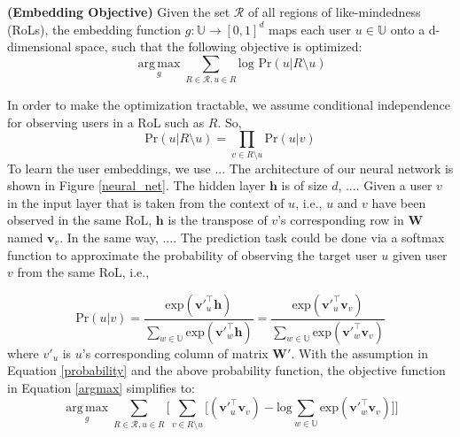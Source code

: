 \documentclass[sigconf]{acmart}
\begin{document}
\begin{definition}
\textbf{(Embedding Objective)} Given the set $\mathcal{R}$ of all regions of like-mindedness (RoLs), the embedding function $g:\mathbb{U}\rightarrow{[0,1]^d}$ maps each user $u\in\mathbb{U}$ onto a d-dimensional space, such that the following objective is optimized:
\begin{equation}\label{argmax}
    {\operatorname*{arg\,max}_g\sum_{R\in\mathcal{R},u\in{R}}{\text{log Pr}(u|R\setminus{u})}}
\end{equation}
\end{definition}

In order to make the optimization tractable, we assume conditional independence for observing users in a RoL such as $R$. So,
\begin{equation}\label{probability}
    \text{Pr}(u|R\setminus{u})=\prod_{v\in{R\setminus{u}}}{\text{Pr}(u|v)}
\end{equation}
To learn the user embeddings, we use ... The architecture of our neural network is shown in Figure \ref{neural_net}. The hidden layer $\textbf{h}$ is of size $d$, .... Given a user $v$ in the input layer that is taken from the context of $u$, i.e., $u$ and $v$ have been observed in the same RoL, $\textbf{h}$ is the transpose of $v$'s corresponding row in $\textbf{W}$ named $\textbf{v}_v$. In the same way, .... The prediction task could be done via a softmax function to approximate the probability of observing the target user $u$ given user $v$ from the same RoL, i.e.,


\begin{equation}\label{softmax}
\text{Pr}(u|v) = \frac{\text{exp}({\textbf{v}'^{\top}_u\textbf{h}})}{\sum\limits_{w\in\mathbb{U}}{\text{exp}({\textbf{v}'^{\top}_w\textbf{h}})}}=\frac{\text{exp}({\textbf{v}'^{\top}_u\textbf{v}_v})}{\sum\limits_{w\in\mathbb{U}}{\text{exp}({\textbf{v}'^{\top}_w\textbf{v}_v})}}
\end{equation}
where $v'_u$ is $u$'s corresponding column of matrix $\textbf{W}'$. With the assumption in Equation \ref{probability} and the above probability function, the objective function in Equation \ref{argmax} simplifies to:
\begin{equation}\label{simplified_argmax}
{\operatorname*{arg\,max}_g\sum_{R\in\mathcal{R},u\in{R}}{\Big[\sum_{v\in{R}\setminus{u}}{\big[(\textbf{v}'^{\top}_u\textbf{v}_v)-\text{log}{\sum\limits_{w\in\mathbb{U}}{\text{exp}({\textbf{v}'^{\top}_w\textbf{v}_v})}}\big]} \Big]}}
\end{equation}
\end{document}
